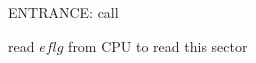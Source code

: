 \documentclass{standalone}
\begin{document}
\begin{algorithm}[H]
  \SetAlgoLined

  ENTRANCE: call \memtest{}\;
  
  \myproc{\memtest{}}
  {
    read $eflg$ from CPU\;
     {
       to read this sector\;
     }
  }
\end{algorithm}
\end{document}
